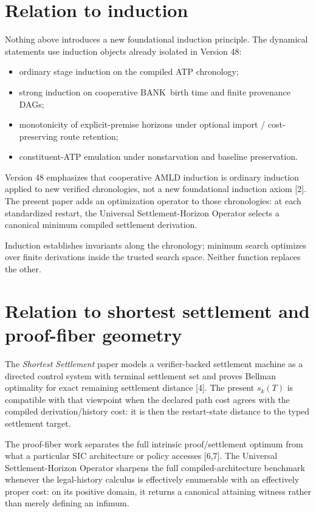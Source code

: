 \documentclass[11pt]{article}
\theoremstyle{definition}
\newcommand{\BANK}{\ensuremath{\mathrm{BANK}}}
\begin{document}
\section{Relation to induction}
Nothing above introduces a new foundational induction principle. The dynamical statements use induction objects already isolated in Version 48:
\begin{itemize}
\item ordinary stage induction on the compiled ATP chronology;
\item strong induction on cooperative \BANK\ birth time and finite provenance DAGs;
\item monotonicity of explicit-premise horizons under optional import / cost-preserving route retention;
\item constituent-ATP emulation under nonstarvation and baseline preservation.
\end{itemize}
Version 48 emphasizes that cooperative AMLD induction is ordinary induction applied to new verified chronologies, not a new foundational induction axiom [2]. The present paper adds an optimization operator to those chronologies: at each standardized restart, the Universal Settlement-Horizon Operator selects a canonical minimum compiled settlement derivation.

Induction establishes invariants along the chronology; minimum search optimizes over finite derivations inside the trusted search space. Neither function replaces the other.

\section{Relation to shortest settlement and proof-fiber geometry}
The \emph{Shortest Settlement} paper models a verifier-backed settlement machine as a directed control system with terminal settlement set and proves Bellman optimality for exact remaining settlement distance [4]. The present $s_k(T)$ is compatible with that viewpoint when the declared path cost agrees with the compiled derivation/history cost: it is then the restart-state distance to the typed settlement target.

The proof-fiber work separates the full intrinsic proof/settlement optimum from what a particular SIC architecture or policy accesses [6,7]. The Universal Settlement-Horizon Operator sharpens the full compiled-architecture benchmark whenever the legal-history calculus is effectively enumerable with an effectively proper cost: on its positive domain, it returns a canonical attaining witness rather than merely defining an infimum.
\end{document}

